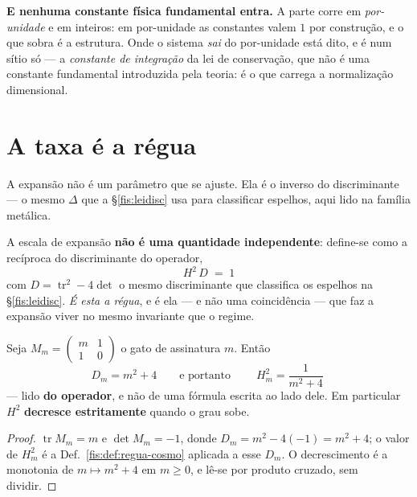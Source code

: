 \documentclass[livro.tex]{subfiles}
\begin{document}
\medskip\noindent\textbf{E nenhuma constante física fundamental entra.} A parte
corre em \emph{por-unidade} e em inteiros: em por-unidade as constantes valem $1$
por construção, e o que sobra é a estrutura. Onde o sistema \emph{sai} do
por-unidade está dito, e é num sítio só --- a \emph{constante de integração} da
lei de conservação, que não é uma constante fundamental introduzida pela teoria:
é o que carrega a normalização dimensional.

\section{A taxa é a régua}\label{fis:taxa}

\noindent A expansão não é um parâmetro que se ajuste. Ela é o inverso do
discriminante --- o mesmo $\Delta$ que a §\ref{fis:leidisc} usa para classificar
espelhos, aqui lido na família metálica.

\begin{definicao}\label{fis:def:regua-cosmo}
A escala de expansão \textbf{não é uma quantidade independente}: define-se como a
recíproca do discriminante do operador,
\[
\boxed{\;H^{2}\,D\;=\;1\;}
\]
com $D=\operatorname{tr}^{2}-4\det$ o mesmo discriminante que classifica os
espelhos na §\ref{fis:leidisc}. \emph{É esta a régua}, e é ela --- e não uma
coincidência --- que faz a expansão viver no mesmo invariante que o regime.
\end{definicao}

\begin{teorema}\label{fis:thm:taxa}
Seja $M_m=\left(\begin{smallmatrix}m&1\\1&0\end{smallmatrix}\right)$ o gato de
assinatura $m$. Então
\[
D_m=m^{2}+4
\qquad\text{e portanto}\qquad
\boxed{\;H_m^{2}=\frac{1}{m^{2}+4}\;}
\]
--- lido \textbf{do operador}, e não de uma fórmula escrita ao lado dele. Em
particular $H^{2}$ \textbf{decresce estritamente} quando o grau sobe.
\end{teorema}

\begin{proof}
$\operatorname{tr}M_m=m$ e $\det M_m=-1$, donde
$D_m=m^{2}-4(-1)=m^{2}+4$; o valor de $H_m^{2}$ é a
Def.~\ref{fis:def:regua-cosmo} aplicada a esse $D_m$. O decrescimento é a
monotonia de $m\mapsto m^{2}+4$ em $m\ge0$, e lê-se por produto cruzado, sem
dividir.
\end{proof}
\end{document}
